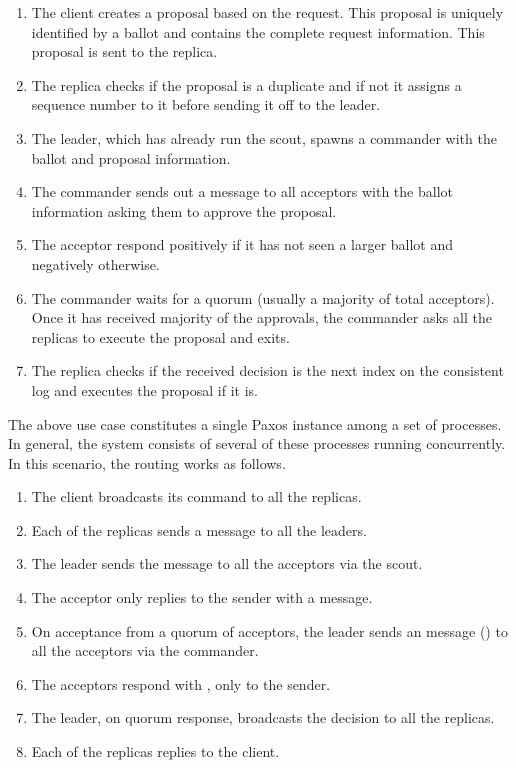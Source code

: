 \begin{enumerate}
    \item The client creates a proposal based on the request. This
      proposal is uniquely identified by a ballot and contains the complete request
      information. This proposal is sent to the replica.
    \item The replica checks if the proposal is a duplicate and if not it
      assigns a sequence number%
      to it before sending it off to the leader.
    \item The leader, which has already run the scout, spawns a commander with
      the ballot and proposal information.
    \item The commander sends out a message to all acceptors with the ballot
      information asking them to approve the proposal.
    \item The acceptor respond positively if it has not seen a larger
      ballot and negatively otherwise.
    \item The commander waits for a quorum (usually a majority of total
      acceptors). Once it has received majority of the approvals,
      the commander asks all the replicas to execute the proposal and exits.
    \item The replica checks if the received decision is the next index on
      the consistent log and executes the proposal if it is.
\end{enumerate}

The above use case constitutes a single Paxos instance among a set of processes.
In general, the system consists of several of these processes running
concurrently. In this scenario, the routing works as follows.

\begin{enumerate}
  \item The client broadcasts its command to all the replicas.
  \item Each of the replicas sends a  message to all the leaders.
  \item The leader sends the  message to all the acceptors via the
    scout.
  \item The acceptor only replies to the sender with a  message.
  \item On acceptance from a quorum of acceptors, the leader sends an
     message () to all the acceptors via the commander.
  \item The acceptors respond with , only to the sender.
  \item The leader, on quorum response, broadcasts the decision to all the
    replicas.
  \item Each of the replicas replies to the client.
\end{enumerate}

